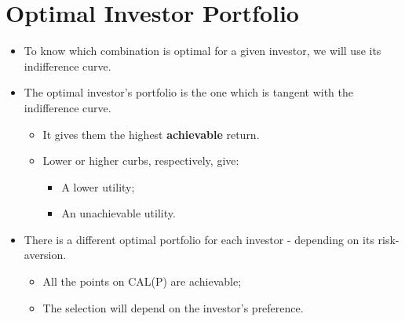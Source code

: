 \documentclass[11pt,a4paper]{report}
\begin{document}
\section{Optimal Investor Portfolio}
\begin{itemize}
    \item To know which combination is optimal for a given investor, we will use its indifference curve.
    \item The optimal investor's portfolio is the one which is tangent with the indifference curve.
    \begin{itemize}
        \item It gives them the highest \textbf{achievable} return.
        \item Lower or higher curbs, respectively, give:
        \begin{itemize}
            \item A lower utility;
            \item An unachievable utility.
        \end{itemize}
    \end{itemize}
    \item There is a different optimal portfolio for each investor - depending on its risk-aversion.
    \begin{itemize}
        \item All the points on CAL(P) are achievable;
        \item The selection will depend on the investor's preference.
    \end{itemize}
\end{itemize}
\end{document}
